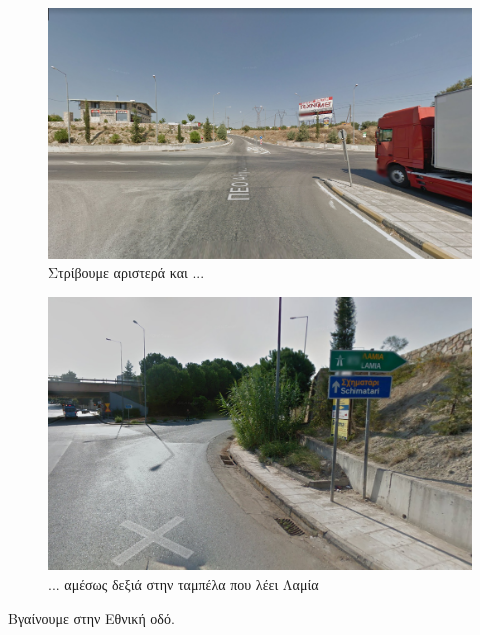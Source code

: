 \begin{figure}[hbp!]
	\centering
		\includegraphics[width=\textwidth]{images/athina-lamia/astefanos/astefanos6.PNG}
			\caption{Στρίβουμε αριστερά και ...}
\end{figure}
\begin{figure}[hbp!]
	\centering
		\includegraphics[width=\textwidth]{images/athina-lamia/astefanos/astefanos7.PNG}
			\caption{... αμέσως δεξιά στην ταμπέλα που λέει Λαμία}
\end{figure}

Βγαίνουμε στην Εθνική οδό.

